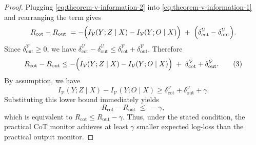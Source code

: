 \documentclass[10pt,a4paper]{amsart}
\begin{document}
\begin{proof}
Plugging \ref{eq:theorem-v-information-2} into \ref{eq:theorem-v-information-1} and rearranging the term gives
\[
R_{\mathrm{cot}}-R_{\mathrm{out}}
\;=-\Bigl(I_{\mathcal{V}}(Y;Z\mid X)-I_{\mathcal{V}}(Y;O\mid X)\Bigr)
\;+\;
\Bigl(\delta^{\mathcal{V}}_{\mathrm{cot}}-\delta^{\mathcal{V}}_{\mathrm{out}}\Bigr).
\]
Since $\delta^{\mathcal{V}}_{\mathrm{out}}\ge 0$, we have
$\delta^{\mathcal{V}}_{\mathrm{cot}}-\delta^{\mathcal{V}}_{\mathrm{out}}
\le \delta^{\mathcal{V}}_{\mathrm{cot}}+\delta^{\mathcal{V}}_{\mathrm{out}}$. Therefore
\[
R_{\mathrm{cot}}-R_{\mathrm{out}}
\le
-\Bigl(I_{\mathcal{V}}(Y;Z\mid X)-I_{\mathcal{V}}(Y;O\mid X)\Bigr)
\;+\;
\delta^{\mathcal{V}}_{\mathrm{cot}}+\delta^{\mathcal{V}}_{\mathrm{out}}.
\tag{3}
\]
By assumption, we have
\[
I_{\mathcal{V}}(Y;Z\mid X)-I_{\mathcal{V}}(Y;O\mid X)
\ge
\delta^{\mathcal{V}}_{\mathrm{cot}}+\delta^{\mathcal{V}}_{\mathrm{out}}+\gamma.
\]
Substituting this lower bound immediately yields
\[
R_{\mathrm{cot}}-R_{\mathrm{out}}
\;\le\;
-\gamma,
\]
which is equivalent to
$R_{\mathrm{cot}}\le R_{\mathrm{out}}-\gamma$. Thus, under the stated condition, the practical CoT monitor achieves at least $\gamma$ smaller expected log-loss than the practical output monitor.
\end{proof}
\end{document}
